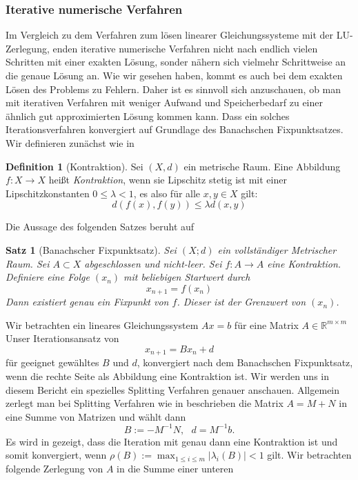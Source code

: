 \documentclass[smallheadings]{scrartcl}
\newtheorem{theorem}{Satz}
\theoremstyle{definition}
\newtheorem{definition}{Definition}[section]
\begin{document}
		\subsubsection{Iterative numerische Verfahren}
			Im Vergleich zu dem Verfahren zum lösen linearer Gleichungssysteme 
			mit der LU-Zerlegung,  enden iterative numerische Verfahren nicht nach
			endlich vielen Schritten mit einer exakten Lösung, sonder nähern sich vielmehr 
			Schrittweise an die genaue Lösung an.  Wie wir gesehen haben, kommt es 
			auch bei dem exakten Lösen des Problems zu Fehlern.  Daher ist es sinnvoll
			sich anzuschauen, ob man mit iterativen Verfahren mit weniger Aufwand
			und Speicherbedarf zu einer ähnlich gut approximierten Lösung
			kommen kann.  Dass ein solches Iterationsverfahren konvergiert auf
			Grundlage des Banachschen Fixpunktsatzes.
			Wir definieren zunächst wie in \citep{kont}
			\begin{definition}[Kontraktion]
			Sei $(X,d)$ ein metrische Raum.  Eine Abbildung $f:X\rightarrow X$ heißt 
			\textit{Kontraktion}, wenn sie Lipschitz stetig ist mit einer Lipschitzkonstanten
			$0\leq \lambda < 1$,  es also für alle $x,y\in X$ gilt:
			$$d(f(x),f(y))\leq \lambda d(x,y)$$
			\end{definition}
			Die Aussage des folgenden Satzes beruht auf \citep{ban}
			\begin{theorem}[Banachscher Fixpunktsatz]
			Sei $(X; d)$ ein vollständiger Metrischer Raum.  Sei $A\subset X$ 
			abgeschlossen und nicht-leer. Sei $f:A\rightarrow A$ eine Kontraktion. Definiere
			eine Folge $(x_n)$ mit beliebigen Startwert durch 
			$$x_{n+1}=f(x_n)$$
			Dann existiert genau ein Fixpunkt von $f$.  Dieser ist der Grenzwert von 
			$(x_n)$.
			\end{theorem}
			Wir betrachten ein lineares Gleichungssystem $Ax=b$ für eine Matrix
			$A\in \mathbb{R}^{m\times m}$ Unser Iterationsansatz von \citep{skript}
			 $$x_{n+1}=Bx_n+d$$
			 für geeignet gewähltes $B$ und $d$,  konvergiert nach dem Banachschen 
			 Fixpunktsatz, wenn die rechte Seite als Abbildung eine 
			 Kontraktion ist. 
			Wir werden uns in diesem Bericht ein spezielles Splitting Verfahren genauer
			anschauen.  Allgemein zerlegt man bei Splitting Verfahren wie in \citep{skript}
			beschrieben die Matrix $A=M+N$ in eine Summe von Matrizen und wählt dann
			$$B:=-M^{-1}N,  \text{ } d=M^{-1}b.$$
			Es wird in \citep{skript} gezeigt, dass die Iteration mit genau dann eine
			Kontraktion ist und somit konvergiert, wenn 
			$\rho (B):=\max_{1\leq i \leq m} |\lambda _i(B)|<1$ gilt.
			Wir betrachten folgende Zerlegung von $A$ in die Summe einer unteren
\end{document}
